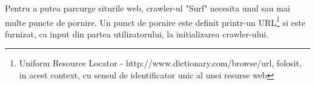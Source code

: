 \newcommand{\urlDescription}{Uniform Resource Locator - http://www.dictionary.com/browse/url, folosit, in acest context, cu sensul de identificator unic al unei resurse web}

Pentru a putea parcurge siturile web, crawler-ul "Surf" necesita unul sau mai multe puncte de pornire. Un punct de pornire este definit printr-un URL\footnote{\urlDescription} si este furnizat, ca input din partea utilizatorului, la initializarea crawler-ului.